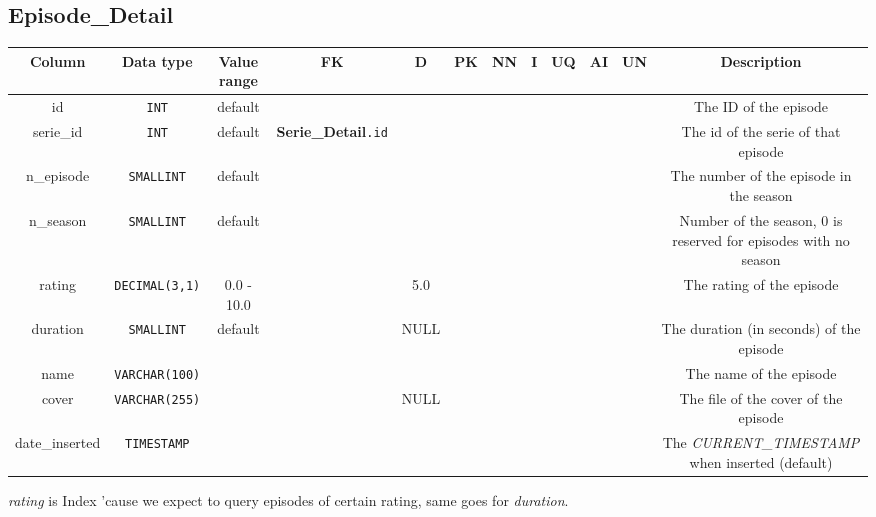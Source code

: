 \documentclass{article}
\newcommand{\dbtable}{\subsection}
\newcommand{\cmark}{\ding{51}}%
\newcommand{\mono}{\texttt}
\begin{document}
	\newpage
	\dbtable{Episode\_Detail}
	\begin{table}[h!]
		\centering
		\begin{tabular}{|c|c|c|c|c|c|c|c|c|c|c|c|}
			\toprule
			\bfseries Column & \bfseries Data type & \bfseries Value range & \bfseries FK & \bfseries D & \bfseries PK & \bfseries NN & \bfseries I & \bfseries UQ & \bfseries AI & \bfseries UN & \bfseries Description\\
			
			\midrule
			id & \mono{INT} & default & & & \cmark & \cmark & \cmark & \cmark & & \cmark & The ID of the episode\\
			
			\midrule
			serie\_id & \mono{INT} & default & \textbf{Serie\_Detail}\mono{.id} & & & \cmark & & & & \cmark & The id of the serie of that episode\\

			\midrule
			n\_episode & \mono{SMALLINT} & default & & & & \cmark & & & & \cmark & The number of the episode in the season\\
			
			\midrule
			n\_season & \mono{SMALLINT} & default & & & & \cmark & & & & \cmark & Number of the season, 0 is reserved for episodes with no season\\
			
			\midrule
			rating & \mono{DECIMAL(3,1)} & 0.0 - 10.0 & & 5.0 & & \cmark & & & & & The rating of the episode\\
			
			\midrule
			duration & \mono{SMALLINT} & default & & NULL & & & & & & \cmark & The duration (in seconds) of the episode\\
			
			\midrule
			name & \mono{VARCHAR(100)} & & & & & \cmark & & & & & The name of the episode\\
			
			\midrule
			cover & \mono{VARCHAR(255)} & & & NULL & & & & & & & The file of the cover of the episode\\
			
			\midrule			
			date\_inserted & \mono{TIMESTAMP} & & & & & \cmark & & & & & The \textit{CURRENT\_TIMESTAMP} when inserted (default)\\
			
			\bottomrule
		\end{tabular}
	\end{table}
	\textit{rating} is Index 'cause we expect to query episodes of certain rating, same goes for \textit{duration}.
	
\end{document}

